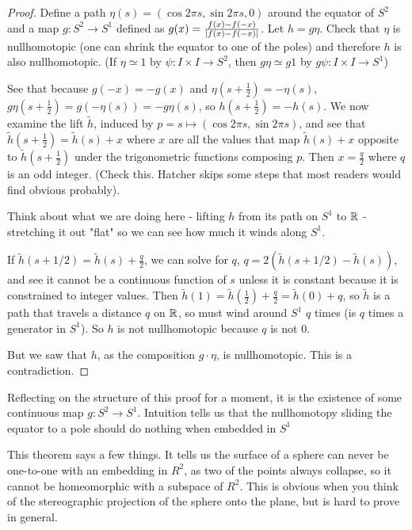 \documentclass[10pt]{article}
\begin{document}
\begin{proof}

	Define a path $\eta(s) = (\cos 2\pi s, \sin 2\pi s, 0)$ around the equator of
	$S^2$ and a map $g: S^2 \to S^1$ defined as $g(x) = \frac{f(x) -
	f(-x)}{\lvert f(x) - f(-x)\rvert}$. Let $h = g\eta$. Check that $\eta$ is
	nullhomotopic (one can shrink the equator to one of the poles) and therefore
	$h$ is also nullhomotopic. (If $\eta \simeq 1$ by $\psi: I \times I \to S^2$,
	then $g\eta \simeq g 1$ by $g \psi : I \times I \to S^1$)

	See that because $g(-x) = -g(x)$ and $\eta(s + \frac 1 2) = -\eta(s)$,
	$g\eta(s + \frac 1 2) = g(-\eta(s)) = -g\eta(s)$, so $h(s + \frac 1 2) =
	-h(s)$. We now examine the lift $\tilde{h}$, induced by $p = s \mapsto (\cos
	2\pi s, \sin 2\pi s)$, and see that $\tilde{h}(s+\frac 1 2) = \tilde{h}(s) +x$
	where $x$ are all the values that map $\tilde{h}(s) +x$ opposite to
	$\tilde{h}(s+\frac 1 2)$ under the trigonometric functions composing $p$.
	Then $x = \frac q 2$ where $q$ is an odd integer. (Check this. Hatcher skips
	some steps that most readers would find obvious probably).

	Think about what we are doing here - lifting $h$ from its path on $S^1$ to
	$\mathbb{R}$ - stretching it out "flat" so we can see how much it winds along $S^1$.

	If $\tilde{h}(s + 1/2) = \tilde{h}(s) + \frac q 2$, we can solve for $q$, $q
	= 2(\tilde{h}(s + 1/2) - \tilde{h}(s))$, and see it cannot be a continuous
	function of $s$ unless it is constant because it is constrained to integer
	values. Then $\tilde{h}(1) = \tilde{h}(\frac 1 2) + \frac q 2 = \tilde{h}(0)
	+ q$, so $\tilde{h}$ is a path that travels a distance $q$ on $\mathbb{R}$, so must wind
	around $S^1$ $q$ times (is $q$ times a generator in $S^1$). So $h$ is not
	nullhomotopic because $q$ is not 0.

	But we saw that $h$, as the composition $g \cdot \eta$, is nullhomotopic.
	This is a contradiction.

\end{proof}


Reflecting on the structure of this proof for a moment, it is the existence of
some continuous map $g: S^2 \to S^1$. Intuition tells us that the nullhomotopy
sliding the equator to a pole should do nothing when embedded in $S^1$

This theorem says a few things. It tells us the surface of a sphere can never
be one-to-one with an embedding in $R^2$, as two of the points always collapse,
so it cannot be homeomorphic with a subspace of $R^2$. This is obvious when you
think of the stereographic projection of the sphere onto the plane, but is hard
to prove in general.
\end{document}
